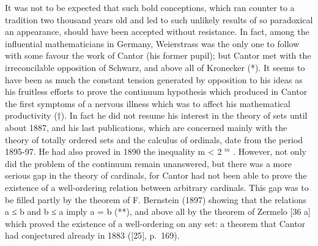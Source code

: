 It was not to be expected that such bold conceptions, which ran counter to a tradition two thousand years old and led to such unlikely results of so paradoxical an appearance, should have been accepted without resistance. In fact, among the influential mathematicians in Germany, Weierstrass was the only one to follow with some favour the work of Cantor (his former pupil); but Cantor met with the irreconcilable opposition of Schwarz, and above all of Kronecker (*). It seems to have been as much the constant tension generated by opposition to his ideas as his fruitless efforts to prove the continuum hypothesis which produced in Cantor the first symptoms of a nervous illness which was to affect his mathematical productivity (†). In fact he did not resume his interest in the theory of sets until about 1887, and his last publications, which are concerned mainly with the theory of totally ordered sets and the calculus of ordinals, date from the period 1895-97. He had also proved in 1890 the inequality m \textless{} 2 \(^{m}\) . However, not only did the problem of the continuum remain unanswered, but there was a more serious gap in the theory of cardinals, for Cantor had not been able to prove the existence of a well-ordering relation between arbitrary cardinals. This gap was to be filled partly by the theorem of F. Bernstein (1897) showing that the relations a ≤ b and b ≤ a imply a = b (**), and above all by the theorem of Zermelo {[}36 a{]} which proved the existence of a well-ordering on any set: a theorem that Cantor had conjectured already in 1883 ({[}25{]}, p.~169).

